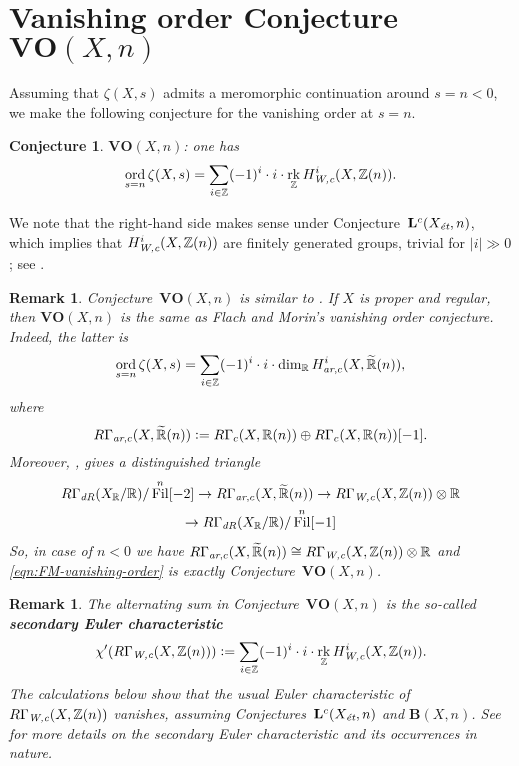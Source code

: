 \documentclass[10pt,a4paper,oneside]{article}
\DeclareMathOperator{\Fil}{Fil}
\DeclareMathOperator{\ord}{ord}
\DeclareMathOperator{\rk}{rk}
\newcommand{\RR}{\mathbb{R}}
\newcommand{\ZZ}{\mathbb{Z}}
\newcommand{\ar}{\text{\it ar}}
\newcommand{\dR}{\text{\it dR}}
\newcommand{\et}{\text{\it \'{e}t}}
\newcommand{\Wc}{\text{\it W,c}}
\newcommand{\dfn}{\mathrel{\mathop:}=}
\theoremstyle{myplain}
\theoremstyle{mydefinition}
\newtheorem{conjecture}[theorem]{Conjecture}
\newtheorem{remark}[theorem]{Remark}
\numberwithin{equation}{section}
\begin{document}

\section{Vanishing order Conjecture $\mathbf{VO} (X,n)$}
\label{sec:vanishing-order-conjecture}

Assuming that $\zeta (X,s)$ admits a meromorphic continuation around
$s = n < 0$, we make the following conjecture for the vanishing order at
$s = n$.

\begin{conjecture}
  $\mathbf{VO} (X,n)$: one has
  \[ \ord_{s=n} \zeta (X,s) =
    \sum_{i \in \ZZ} (-1)^i \cdot i \cdot \rk_\ZZ H^i_\Wc (X, \ZZ (n)). \]
\end{conjecture}

We note that the right-hand side makes sense under
Conjecture~$\mathbf{L}^c (X_\et,n)$, which implies that $H^i_\Wc (X, \ZZ (n))$
are finitely generated groups, trivial for $|i| \gg 0$;
see \cite[Proposition~7.12]{Beshenov-Weil-etale-1}.

\begin{remark}
  Conjecture~$\mathbf{VO} (X,n)$ is similar to
  \cite[Conjecture~5.11]{Flach-Morin-2018}. If $X$ is proper and regular, then
  $\mathbf{VO} (X,n)$ is the same as Flach and Morin's vanishing order
  conjecture. Indeed, the latter is
  \begin{equation}
    \label{eqn:FM-vanishing-order}
    \ord_{s = n} \zeta (X,s) =
    \sum_{i\in \ZZ} (-1)^i \cdot i \cdot \dim_\RR H^i_{\ar,c} (X, \widetilde{\RR}(n)),
  \end{equation}
  where
  \[ R\Gamma_{\ar,c} (X, \widetilde{\RR}(n)) \dfn
    R\Gamma_c (X, \RR(n)) \oplus R\Gamma_c (X, \RR(n)) [-1]. \]
  Moreover, \cite[Proposition 4.14]{Flach-Morin-2018}, gives a distinguished
  triangle
  \begin{multline*}
    R\Gamma_\dR (X_\RR/\RR) / \Fil^n [-2] \to
    R\Gamma_{\ar,c} (X, \widetilde{\RR}(n)) \to
    R\Gamma_\Wc (X, \ZZ(n)) \otimes \RR \\
    \to R\Gamma_\dR (X_\RR/\RR) / \Fil^n [-1]
  \end{multline*}
  So, in case of $n < 0$ we have
  $R\Gamma_{\ar,c} (X, \widetilde{\RR}(n)) \cong
  R\Gamma_\Wc (X, \ZZ(n)) \otimes \RR$ and
  \eqref{eqn:FM-vanishing-order} is exactly Conjecture~$\mathbf{VO} (X,n)$.
\end{remark}

\begin{remark}
  The alternating sum in Conjecture~$\mathbf{VO} (X,n)$ is the so-called
  \textbf{secondary Euler characteristic}
  \[ \chi' (R\Gamma_\Wc (X, \ZZ (n))) \dfn
    \sum_{i \in \ZZ} (-1)^i \cdot i \cdot \rk_\ZZ H^i_\Wc (X, \ZZ (n)). \]
  The calculations below show that the usual Euler characteristic of
  $R\Gamma_\Wc (X, \ZZ (n))$ vanishes, assuming
  Conjectures~$\mathbf{L}^c (X_\et,n)$ and $\mathbf{B} (X,n)$.  See
  \cite{Ramachandran-2016} for more details on the secondary Euler
  characteristic and its occurrences in nature.
\end{remark}
\end{document}
